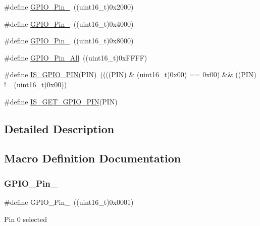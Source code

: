 \begin{DoxyCompactItemize}
\item 
\#define \hyperlink{group___g_p_i_o__pins__define_ga4155a41c433f3657b9c79cfbd4240966}{G\+P\+I\+O\+\_\+\+Pin\+\_}~((uint16\+\_\+t)0x2000)
\item 
\#define \hyperlink{group___g_p_i_o__pins__define_ga21cd1d89c0c061a6f09c5a842610bee5}{G\+P\+I\+O\+\_\+\+Pin\+\_}~((uint16\+\_\+t)0x4000)
\item 
\#define \hyperlink{group___g_p_i_o__pins__define_gae686a9fc47cf3e420e5db0784210711d}{G\+P\+I\+O\+\_\+\+Pin\+\_}~((uint16\+\_\+t)0x8000)
\item 
\#define \hyperlink{group___g_p_i_o__pins__define_gaba3e915ddca17a1211edc07b7fd97e8b}{G\+P\+I\+O\+\_\+\+Pin\+\_\+\+All}~((uint16\+\_\+t)0x\+F\+F\+F\+F)
\item 
\#define \hyperlink{group___g_p_i_o__pins__define_gad6ec74e33360395535ad5d91ba6d4781}{I\+S\+\_\+\+G\+P\+I\+O\+\_\+\+P\+IN}(P\+IN)~((((P\+IN) \& (uint16\+\_\+t)0x00) == 0x00) \&\& ((\+P\+I\+N) != (uint16\+\_\+t)0x00))
\item 
\#define \hyperlink{group___g_p_i_o__pins__define_gaddf7154b7f30b7c0a70f3aeaff5ddffc}{I\+S\+\_\+\+G\+E\+T\+\_\+\+G\+P\+I\+O\+\_\+\+P\+IN}(P\+IN)
\end{DoxyCompactItemize}


\subsection{Detailed Description}


\subsection{Macro Definition Documentation}
\mbox{\label{group___g_p_i_o__pins__define_gab305b8d1be9f89bf2b4a05589b456049}} 
\subsubsection{\texorpdfstring{G\+P\+I\+O\+\_\+\+Pin\+\_}{GPIO\_Pin\_0}}
{\footnotesize\ttfamily \#define G\+P\+I\+O\+\_\+\+Pin\+\_~((uint16\+\_\+t)0x0001)}

Pin 0 selected 

